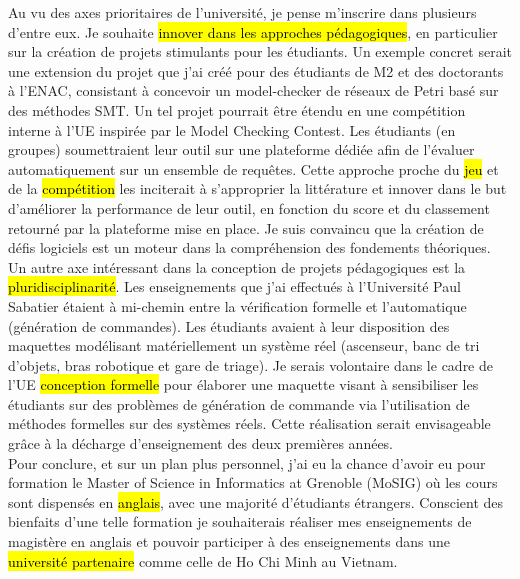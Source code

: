 Au vu des axes prioritaires de l'université, je pense m'inscrire dans plusieurs
d'entre eux. Je souhaite \hl{innover dans les approches pédagogiques}, en
particulier sur la création de projets stimulants pour les étudiants. Un exemple
concret serait une extension du projet que j'ai créé pour des étudiants de M2 et
des doctorants à l'ENAC, consistant à concevoir un model-checker de réseaux de
Petri basé sur des méthodes SMT. Un tel projet pourrait être étendu en une
compétition interne à l'UE inspirée par le Model Checking Contest. Les étudiants
(en groupes) soumettraient leur outil sur une plateforme dédiée afin de
l'évaluer automatiquement sur un ensemble de requêtes. Cette approche proche du
\hl{jeu} et de la \hl{compétition} les inciterait à s'approprier la littérature et
innover dans le but d'améliorer la performance de leur outil, en fonction du
score et du classement retourné par la plateforme mise en place. Je suis
convaincu que la création de défis logiciels est un moteur dans la
compréhension des fondements théoriques.\\


Un autre axe intéressant dans la conception de projets pédagogiques est la
\hl{pluridisciplinarité}. Les enseignements que
j'ai effectués à l'Université Paul Sabatier étaient à mi-chemin entre la
vérification formelle et l'automatique (génération de commandes). Les étudiants
avaient à leur disposition des maquettes modélisant matériellement un système
réel (ascenseur, banc de tri d'objets, bras robotique et gare de triage). Je serais volontaire dans
le cadre de l'UE \og \hl{conception formelle} \fg pour élaborer une maquette
visant à sensibiliser les étudiants sur des problèmes de génération de commande
via l'utilisation de méthodes formelles sur des systèmes réels. Cette
réalisation serait envisageable grâce à la décharge d'enseignement des deux
premières années.\\

Pour conclure, et sur un plan plus personnel, j'ai eu la chance d'avoir eu pour
formation le Master of Science in Informatics at Grenoble (MoSIG) où les cours
sont dispensés en \hl{anglais}, avec une majorité d'étudiants étrangers.
Conscient des bienfaits d'une telle formation je souhaiterais réaliser mes
enseignements de magistère en anglais et pouvoir participer à des enseignements
dans une \hl{université partenaire} comme celle de Ho Chi Minh au Vietnam.
